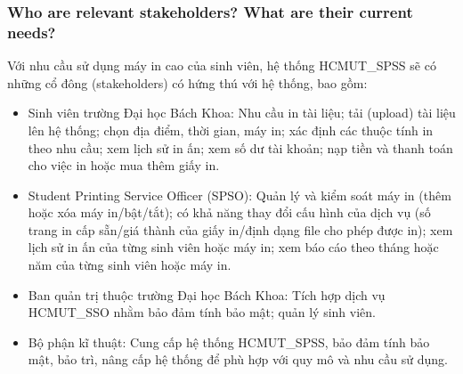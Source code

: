     \subsubsection{Who are relevant stakeholders? What are their current needs?}
    Với nhu cầu sử dụng máy in cao của sinh viên, hệ thống HCMUT\_SPSS sẽ có những cổ đông (stakeholders) có hứng thú với hệ thống, bao gồm:
    \begin{itemize}
        \item Sinh viên trường Đại học Bách Khoa: Nhu cầu in tài liệu; tải (upload) tài liệu lên hệ thống; chọn địa điểm, thời gian, máy in; xác định các thuộc tính in theo nhu cầu; xem lịch sử in ấn; xem số dư tài khoản; nạp tiền và thanh toán cho việc in hoặc mua thêm giấy in.
        \item Student Printing Service Officer (SPSO): Quản lý và kiểm soát máy in (thêm hoặc xóa máy in/bật/tắt); có khả năng thay đổi cấu hình của dịch vụ (số trang in cấp sẵn/giá thành của giấy in/định dạng file cho phép được in); xem lịch sử in ấn của từng sinh viên hoặc máy in; xem báo cáo theo tháng hoặc năm của từng sinh viên hoặc máy in.
        \item Ban quản trị thuộc trường Đại học Bách Khoa: Tích hợp dịch vụ HCMUT\_SSO nhằm bảo đảm tính bảo mật; quản lý sinh viên.
        \item Bộ phận kĩ thuật: Cung cấp hệ thống HCMUT\_SPSS, bảo đảm tính bảo mật, bảo trì, nâng cấp hệ thống để phù hợp với quy mô và nhu cầu sử dụng.
    \end{itemize}
    
